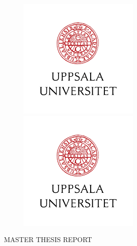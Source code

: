 \documentclass[a4]{report}
\begin{document}
        \begin{titlepage}

            \begin{figure}
                \begin{minipage}{0.48\textwidth}
                    \begin{flushleft}
                        \includegraphics[scale=0.5]{images/UU_LOGO.png}
                    \end{flushleft}
                \end{minipage}\hfill
                \begin{minipage}{0.48\textwidth}
                    \begin{flushright}
                        \includegraphics[scale=0.5]{images/UU_LOGO.png}
                    \end{flushright}
                \end{minipage}
            \end{figure}

            \thispagestyle{fancy}

            \vspace{1in}

            \center

            \textsc{\large MASTER THESIS REPORT}

            \vspace{0.5in}


\end{titlepage}
\end{document}
